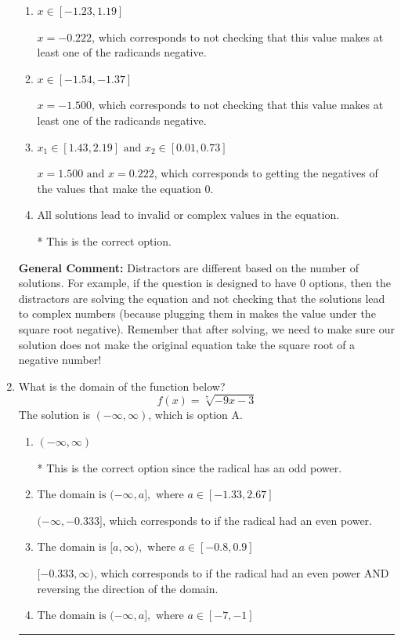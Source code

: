 \documentclass{extbook}[14pt]
\newcommand{\litem}[1]{\item #1

\rule{\textwidth}{0.4pt}}
\begin{document}
\begin{enumerate}
{\begin{enumerate}[label=\Alph*.]
$x = -1.500 \text{ and } x = -0.222$, which corresponds to not checking that BOTH values make at least one of the radicands negative.
\item \( x \in [-1.23,1.19] \)

$x = -0.222$, which corresponds to not checking that this value makes at least one of the radicands negative.
\item \( x \in [-1.54,-1.37] \)

$x = -1.500$, which corresponds to not checking that this value makes at least one of the radicands negative.
\item \( x_1 \in [1.43, 2.19] \text{ and } x_2 \in [0.01,0.73] \)

$x = 1.500 \text{ and } x = 0.222$, which corresponds to getting the negatives of the values that make the equation 0.
\item \( \text{All solutions lead to invalid or complex values in the equation.} \)

* This is the correct option.
\end{enumerate}

\textbf{General Comment:} Distractors are different based on the number of solutions. For example, if the question is designed to have 0 options, then the distractors are solving the equation and not checking that the solutions lead to complex numbers (because plugging them in makes the value under the square root negative). Remember that after solving, we need to make sure our solution does not make the original equation take the square root of a negative number!
}
\litem{
What is the domain of the function below?
\[ f(x) = \sqrt[7]{-9 x - 3} \]The solution is \( (-\infty, \infty) \), which is option A.\begin{enumerate}[label=\Alph*.]
\item \( (-\infty, \infty) \)

* This is the correct option since the radical has an odd power.
\item \( \text{The domain is } (-\infty, a], \text{   where } a \in [-1.33, 2.67] \)

$(-\infty, -0.333]$, which corresponds to if the radical had an even power.
\item \( \text{The domain is } [a, \infty), \text{   where } a \in [-0.8, 0.9] \)

$[-0.333, \infty)$, which corresponds to if the radical had an even power AND reversing the direction of the domain.
\item \( \text{The domain is } (-\infty, a], \text{   where } a \in [-7, -1] \)


\end{enumerate}}
\end{enumerate}
\end{document}
